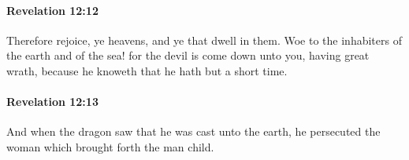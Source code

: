 		\paragraph{Revelation 12:12} %
			\label{REVELATIONNT-12-12}

			Therefore rejoice, ye heavens, and ye that dwell in them. Woe to the inhabiters of the earth and of the sea! for the devil is come down unto you, having great wrath, because he knoweth that he hath but a short time.

			\begin{framed}
			\scriptsize
				\begin{compactdesc}
					\item[SBLG] 
				\end{compactdesc}
			\end{framed}

		\paragraph{Revelation 12:13} %
			\label{REVELATIONNT-12-13}

			And when the dragon saw that he was cast unto the earth, he persecuted the woman which brought forth the man child.

